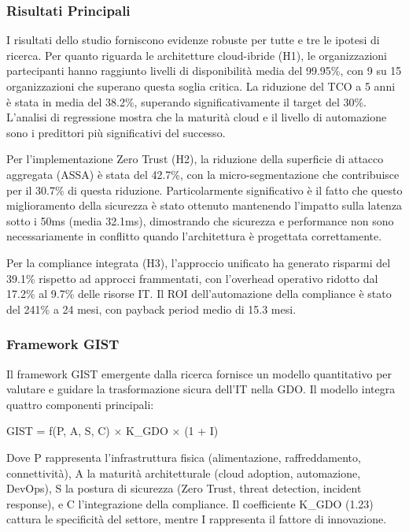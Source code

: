 \documentclass{report}
\begin{document}
\subsubsection{Risultati Principali}\label{risultati-principali}

I risultati dello studio forniscono evidenze robuste per tutte e tre le
ipotesi di ricerca. Per quanto riguarda le architetture cloud-ibride
(H1), le organizzazioni partecipanti hanno raggiunto livelli di
disponibilità media del 99.95\%, con 9 su 15 organizzazioni che superano
questa soglia critica. La riduzione del TCO a 5 anni è stata in media
del 38.2\%, superando significativamente il target del 30\%. L'analisi
di regressione mostra che la maturità cloud e il livello di automazione
sono i predittori più significativi del successo.

Per l'implementazione Zero Trust (H2), la riduzione della superficie di
attacco aggregata (ASSA) è stata del 42.7\%, con la micro-segmentazione
che contribuisce per il 30.7\% di questa riduzione. Particolarmente
significativo è il fatto che questo miglioramento della sicurezza è
stato ottenuto mantenendo l'impatto sulla latenza sotto i 50ms (media
32.1ms), dimostrando che sicurezza e performance non sono
necessariamente in conflitto quando l'architettura è progettata
correttamente.

Per la compliance integrata (H3), l'approccio unificato ha generato
risparmi del 39.1\% rispetto ad approcci frammentati, con l'overhead
operativo ridotto dal 17.2\% al 9.7\% delle risorse IT. Il ROI
dell'automazione della compliance è stato del 241\% a 24 mesi, con
payback period medio di 15.3 mesi.

\subsubsection{Framework GIST}\label{framework-gist}

Il framework GIST emergente dalla ricerca fornisce un modello
quantitativo per valutare e guidare la trasformazione sicura dell'IT
nella GDO. Il modello integra quattro componenti principali:

GIST = f(P, A, S, C) × K\_GDO × (1 + I)

Dove P rappresenta l'infrastruttura fisica (alimentazione,
raffreddamento, connettività), A la maturità architetturale (cloud
adoption, automazione, DevOps), S la postura di sicurezza (Zero Trust,
threat detection, incident response), e C l'integrazione della
compliance. Il coefficiente K\_GDO (1.23) cattura le specificità del
settore, mentre I rappresenta il fattore di innovazione.
\end{document}
